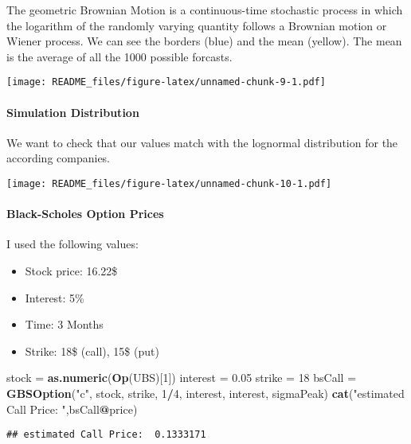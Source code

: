 \documentclass[]{article}
\newenvironment{Shaded}{\begin{snugshade}}{\end{snugshade}}
\newcommand{\KeywordTok}[1]{\textcolor[rgb]{0.13,0.29,0.53}{\textbf{#1}}}
\newcommand{\DecValTok}[1]{\textcolor[rgb]{0.00,0.00,0.81}{#1}}
\newcommand{\FloatTok}[1]{\textcolor[rgb]{0.00,0.00,0.81}{#1}}
\newcommand{\StringTok}[1]{\textcolor[rgb]{0.31,0.60,0.02}{#1}}
\newcommand{\OperatorTok}[1]{\textcolor[rgb]{0.81,0.36,0.00}{\textbf{#1}}}
\newcommand{\NormalTok}[1]{#1}
\providecommand{\tightlist}{%
  \setlength{\itemsep}{0pt}\setlength{\parskip}{0pt}}
\let\oldparagraph\paragraph
\renewcommand{\paragraph}[1]{\oldparagraph{#1}\mbox{}}
\begin{document}
The geometric Brownian Motion is a continuous-time stochastic process in
which the logarithm of the randomly varying quantity follows a Brownian
motion or Wiener process. We can see the borders (blue) and the mean
(yellow). The mean is the average of all the 1000 possible forcasts.

\texttt{[image: README\_files/figure-latex/unnamed-chunk-9-1.pdf]}

\paragraph{Simulation Distribution}\label{simulation-distribution-1}

We want to check that our values match with the lognormal distribution
for the according companies.

\texttt{[image: README\_files/figure-latex/unnamed-chunk-10-1.pdf]}

\paragraph{Black-Scholes Option
Prices}\label{black-scholes-option-prices-1}

I used the following values:

\begin{itemize}
\tightlist
\item
  Stock price: 16.22\$
\item
  Interest: 5\%
\item
  Time: 3 Months
\item
  Strike: 18\$ (call), 15\$ (put)
\end{itemize}

\begin{Shaded}
\begin{Highlighting}[]
\NormalTok{stock =}\StringTok{ }\KeywordTok{as.numeric}\NormalTok{(}\KeywordTok{Op}\NormalTok{(UBS)[}\DecValTok{1}\NormalTok{])}
\NormalTok{interest =}\StringTok{ }\FloatTok{0.05}
\NormalTok{strike =}\StringTok{ }\DecValTok{18}
\NormalTok{bsCall =}\StringTok{ }\KeywordTok{GBSOption}\NormalTok{(}\StringTok{"c"}\NormalTok{, stock, strike, }\DecValTok{1}\OperatorTok{/}\DecValTok{4}\NormalTok{, interest, interest, sigmaPeak)}
\KeywordTok{cat}\NormalTok{(}\StringTok{"estimated Call Price: "}\NormalTok{,bsCall}\OperatorTok{@}\NormalTok{price)}
\end{Highlighting}
\end{Shaded}

\begin{verbatim}
## estimated Call Price:  0.1333171
\end{verbatim}
\end{document}
